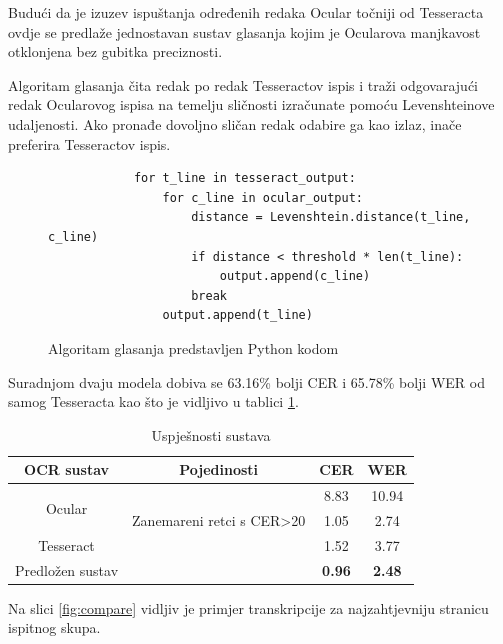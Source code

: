 \documentclass[zavrsnirad]{fer}
\begin{document}
Budući da je izuzev ispuštanja određenih redaka Ocular točniji od Tesseracta ovdje se predlaže jednostavan sustav glasanja kojim je Ocularova manjkavost otklonjena bez gubitka preciznosti.

Algoritam glasanja čita redak po redak Tesseractov ispis i traži odgovarajući redak Ocularovog ispisa na temelju sličnosti izračunate pomoću Levenshteinove udaljenosti. Ako pronađe dovoljno sličan redak odabire ga kao izlaz, inače preferira Tesseractov ispis.

\begin{figure}[h]
	\centering
	\begin{adjustwidth}{1cm}{1cm}
		\begin{lstlisting}
			for t_line in tesseract_output:
				for c_line in ocular_output:
					distance = Levenshtein.distance(t_line, c_line)
					if distance < threshold * len(t_line):
						output.append(c_line)
					break
				output.append(t_line)
		\end{lstlisting}
	\end{adjustwidth}
	\caption{Algoritam glasanja predstavljen Python kodom}
	\label{fig:python_code}
\end{figure}

Suradnjom dvaju modela dobiva se 63.16\% bolji CER i 65.78\% bolji WER od samog Tesseracta kao što je vidljivo u tablici \ref{tab:system_performance}.

\bgroup
\def\arraystretch{1.25}
\begin{table}[h]
	\centering
	\begin{tabular}{|c|c|c|c|}
		\hline
		\textbf{OCR sustav} & \textbf{Pojedinosti} & \textbf{CER} & \textbf{WER} \\ \hline
		\multirow{2}{*}{Ocular} & & 8.83 & 10.94 \\ \cline{2-4}
								& Zanemareni retci s CER>20 & 1.05 & 2.74 \\ \hline
		Tesseract & & 1.52 & 3.77 \\ \hline
		Predložen sustav & & \textbf{0.96} & \textbf{2.48} \\ \hline
	\end{tabular}
	\caption{Uspješnosti sustava}
	\label{tab:system_performance}
\end{table}
\egroup

Na slici \ref{fig:compare} vidljiv je primjer transkripcije za najzahtjevniju stranicu ispitnog skupa.
\end{document}
